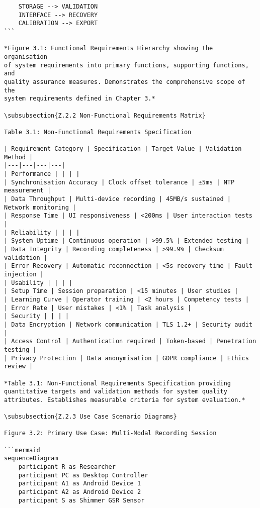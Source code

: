 \begin{verbatim}
    STORAGE --> VALIDATION
    INTERFACE --> RECOVERY
    CALIBRATION --> EXPORT
```

*Figure 3.1: Functional Requirements Hierarchy showing the organisation
of system requirements into primary functions, supporting functions, and
quality assurance measures. Demonstrates the comprehensive scope of the
system requirements defined in Chapter 3.*

\subsubsection{Z.2.2 Non-Functional Requirements Matrix}

Table 3.1: Non-Functional Requirements Specification

| Requirement Category | Specification | Target Value | Validation Method |
|---|---|---|---|
| Performance | | | |
| Synchronisation Accuracy | Clock offset tolerance | ±5ms | NTP measurement |
| Data Throughput | Multi-device recording | 45MB/s sustained | Network monitoring |
| Response Time | UI responsiveness | <200ms | User interaction tests |
| Reliability | | | |
| System Uptime | Continuous operation | >99.5% | Extended testing |
| Data Integrity | Recording completeness | >99.9% | Checksum validation |
| Error Recovery | Automatic reconnection | <5s recovery time | Fault injection |
| Usability | | | |
| Setup Time | Session preparation | <15 minutes | User studies |
| Learning Curve | Operator training | <2 hours | Competency tests |
| Error Rate | User mistakes | <1% | Task analysis |
| Security | | | |
| Data Encryption | Network communication | TLS 1.2+ | Security audit |
| Access Control | Authentication required | Token-based | Penetration testing |
| Privacy Protection | Data anonymisation | GDPR compliance | Ethics review |

*Table 3.1: Non-Functional Requirements Specification providing
quantitative targets and validation methods for system quality
attributes. Establishes measurable criteria for system evaluation.*

\subsubsection{Z.2.3 Use Case Scenario Diagrams}

Figure 3.2: Primary Use Case: Multi-Modal Recording Session

```mermaid
sequenceDiagram
    participant R as Researcher
    participant PC as Desktop Controller
    participant A1 as Android Device 1
    participant A2 as Android Device 2
    participant S as Shimmer GSR Sensor


\end{verbatim}
